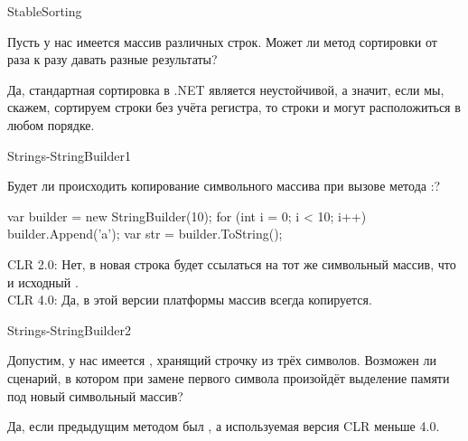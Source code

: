 \begin{defproblem}{StableSorting}
\begin{onlyproblem}
  Пусть у нас имеется массив различных строк. Может ли метод сортировки от раза к разу давать разные результаты?
\end{onlyproblem}
\begin{onlysolution}
  Да, стандартная сортировка в .NET является неустойчивой, а значит, если мы, скажем, сортируем строки без учёта регистра, то строки  и  могут расположиться в любом порядке.
\end{onlysolution}
\end{defproblem}
\begin{defproblem}{Strings-StringBuilder1}
\begin{onlyproblem}
  Будет ли происходить копирование символьного массива при вызове метода :?
  \begin{source}
  var builder = new StringBuilder(10);
  for (int i = 0; i < 10; i++)
    builder.Append('a');
  var str = builder.ToString();
  \end{source}
\end{onlyproblem}
\begin{onlysolution}
  CLR 2.0: Нет, в новая строка будет ссылаться на тот же символьный массив, что и исходный .\\
  CLR 4.0: Да, в этой версии платформы массив всегда копируется.
\end{onlysolution}
\end{defproblem}
\begin{defproblem}{Strings-StringBuilder2}
\begin{onlyproblem}
  Допустим, у нас имеется , хранящий строчку из трёх символов. Возможен ли сценарий, в котором при замене первого символа произойдёт выделение памяти под новый символьный массив?
\end{onlyproblem}
\begin{onlysolution}
  Да, если предыдущим методом был , а используемая версия CLR меньше 4.0.
\end{onlysolution}
\end{defproblem}
